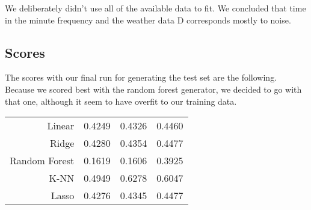 \documentclass[a4paper, 11pt]{article}
\begin{document}
We deliberately didn't use all of the available data to fit.
We concluded that time in the minute frequency and the weather data D corresponds mostly to noise.

\subsection{Scores}

The scores with our final run for generating the test set are the following.
Because we scored best with the random forest generator, we decided to go with that one,
although it seem to have overfit to our training data.

\begin{tabular}{rlll}
Linear        & 0.4249 & 0.4326 & 0.4460 \\
Ridge         & 0.4280 & 0.4354 & 0.4477 \\
Random Forest & 0.1619 & 0.1606 & 0.3925 \\
K-NN          & 0.4949 & 0.6278 & 0.6047 \\
Lasso         & 0.4276 & 0.4345 & 0.4477
\end{tabular}
\end{document}

